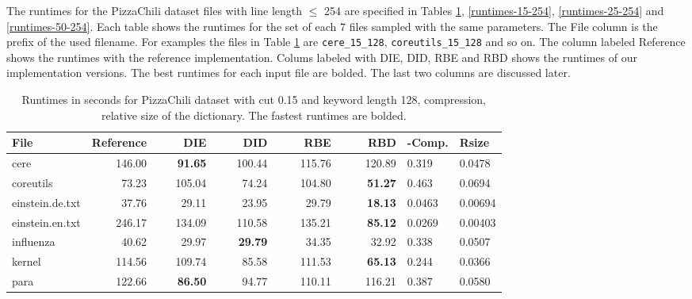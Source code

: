 \documentclass[english,twoside,censored,csm,algorithms-track-2020]{HYthesisML}
\theoremstyle{plain}
\theoremstyle{definition}
\begin{document}
The runtimes for the PizzaChili dataset files with line length $\leq$ 254 are specified in
Tables \ref{runtimes-15-128},
\ref{runtimes-15-254}, \ref{runtimes-25-254} and \ref{runtimes-50-254}. Each table shows the
runtimes for the set of each 7 files sampled with the same parameters. The File column is the
prefix of the used filename. For examples the files in Table \ref{runtimes-15-128} are
\texttt{cere\_15\_128}, \texttt{coreutils\_15\_128} and so on. The column labeled Reference shows
the runtimes with the reference implementation. Colums labeled with DIE, DID, RBE and RBD shows the
runtimes of our implementation versions. The best runtimes for each input file are bolded.
The last two columns are discussed later.

\begin{center}
  \begin{table}
  \begin{tabular} {| l |r r r r r|l l|}
    \hline
    \textbf{File} & \textbf{Reference} & ~~~~\textbf{DIE} & ~~~~\textbf{DID} & ~~~~\textbf{RBE} & ~~~~\textbf{RBD} & \textbf{-Comp.} & \textbf{Rsize} \\
    \hline
    cere & 146.00 & \textbf{91.65} & 100.44 & 115.76 & 120.89            & 0.319  & 0.0478  \\
    coreutils & 73.23 & 105.04 & 74.24 & 104.80 & \textbf{51.27}         & 0.463  & 0.0694  \\
    einstein.de.txt & 37.76 & 29.11 & 23.95 & 29.79 & \textbf{18.13}     & 0.0463 & 0.00694 \\
    einstein.en.txt & 246.17 & 134.09 & 110.58 & 135.21 & \textbf{85.12} & 0.0269 & 0.00403 \\
    influenza & 40.62 & 29.97 & \textbf{29.79} & 34.35 & 32.92           & 0.338  & 0.0507  \\
    kernel & 114.56 & 109.74 & 85.58 & 111.53 & \textbf{65.13}           & 0.244  & 0.0366  \\
    para & 122.66 & \textbf{86.50} & 94.77 & 110.11 & 116.21             & 0.387  & 0.0580  \\
    \hline
  \end{tabular}
  \caption{Runtimes in seconds for PizzaChili dataset with cut 0.15 and keyword length 128, compression, relative size of the dictionary. The fastest runtimes are bolded.}
  \label{runtimes-15-128}
  \end{table}
\end{center}
\end{document}
